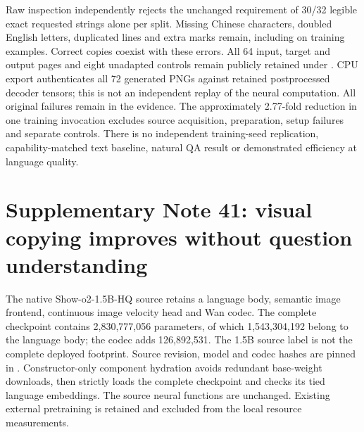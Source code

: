 \documentclass[10pt,a4paper]{article}
\begin{document}
Raw inspection independently rejects the unchanged requirement of 30/32
legible exact requested strings alone per split. Missing Chinese characters,
doubled English letters, duplicated lines and extra marks remain, including
on training examples. Correct copies coexist with these errors. All 64 input,
target and output pages and eight unadapted controls remain publicly retained
under . CPU export authenticates
all 72 generated PNGs against retained postprocessed decoder tensors; this
is not an independent replay of the neural computation. All original failures
remain in the evidence. The approximately 2.77-fold reduction in one training
invocation excludes source acquisition, preparation, setup failures and separate
controls. There is no independent training-seed replication, capability-matched
text baseline, natural QA result or demonstrated efficiency at language quality.


\clearpage
\section*{Supplementary Note 41: visual copying improves without question understanding}
The native Show-o2-1.5B-HQ source\cite{showo2} retains a language body,
semantic image frontend, continuous image velocity head and Wan codec. The
complete checkpoint contains 2,830,777,056 parameters, of which
1,543,304,192 belong to the language body; the codec adds 126,892,531.
The 1.5B source label is not the complete deployed footprint. Source revision,
model and codec hashes are pinned in
. Constructor-only component
hydration avoids redundant base-weight downloads, then strictly loads the
complete checkpoint and checks its tied language embeddings. The source neural
functions are unchanged. Existing external pretraining is retained and excluded
from the local resource measurements.
\end{document}
